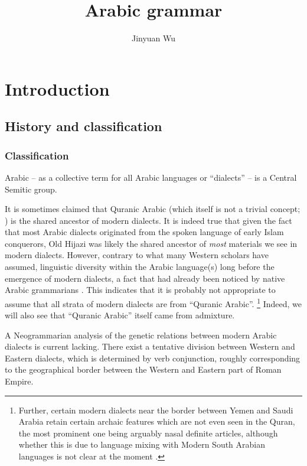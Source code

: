 \documentclass[a4paper, oneside, 12pt]{report}
\title{Arabic grammar}
\author{Jinyuan Wu}
\newcommand*{\citepages}[1]{pp.~{#1}}
\begin{document}
\maketitle

\chapter{Introduction}

\section{History and classification}

\subsection{Classification}

Arabic -- as a collective term for all Arabic languages or ``dialects'' --
is a Central Semitic group.

It is sometimes claimed that Quranic Arabic
(which itself is not a trivial concept; )
is the shared ancestor of modern dialects.
It is indeed true that 
given the fact that most Arabic dialects originated from the spoken language 
of early Islam conquerors, Old Hijazi was likely the shared ancestor 
of \emph{most} materials we see in modern dialects.
However, contrary to what many Western scholars have assumed,
linguistic diversity within the Arabic language(s)
long before the emergence of modern dialects,
a fact that had already been noticed by native Arabic grammarians
\citep[\citepages{15-39}]{van2022quranic}.
This indicates that it is probably not appropriate to assume that all strata of modern dialects are from ``Quranic Arabic''.%
\footnote{
Further, certain modern dialects near the border between Yemen and Saudi Arabia
retain certain archaic features which are not even seen in the Quran,
the most prominent one being arguably nasal definite articles,
although whether this is due to language mixing with Modern South Arabian languages is not clear at the moment \citep{watson2018south}.
}
Indeed, we will also see that ``Quranic Arabic'' itself came from admixture.

A Neogrammarian analysis of the genetic relations 
between modern Arabic dialects is current lacking.
There exist a tentative division between Western and Eastern dialects,
which is determined by verb conjunction,
roughly corresponding to the geographical border between 
the Western and Eastern part of Roman Empire.
\end{document}
